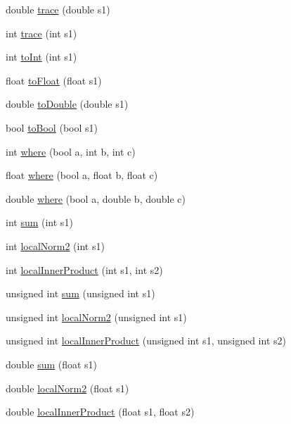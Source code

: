 \begin{DoxyCompactItemize}
double \mbox{\hyperlink{group__simpleword_ga42388e8cf5ff017e87fde24804dc5157}{trace}} (double s1)
\item 
int \mbox{\hyperlink{group__simpleword_ga1cfdc081dea5ca70a94e611e24767931}{trace}} (int s1)
\item 
int \mbox{\hyperlink{group__simpleword_ga8069a9dba7bde8afd620565f8628fb68}{to\+Int}} (int s1)
\item 
float \mbox{\hyperlink{group__simpleword_ga6f3aac1379a793726dc2c71317d99422}{to\+Float}} (float s1)
\item 
double \mbox{\hyperlink{group__simpleword_ga14c2748b5624a157ba57c143b2b67072}{to\+Double}} (double s1)
\item 
bool \mbox{\hyperlink{group__simpleword_gacd3ee735ab005c2fc3af8bdd6c3aa9a6}{to\+Bool}} (bool s1)
\item 
int \mbox{\hyperlink{group__simpleword_gaca8f67f6f4b42cad187907674810e9a6}{where}} (bool a, int b, int c)
\item 
float \mbox{\hyperlink{group__simpleword_ga3fc05e05bd31e7772dd36892a7641c5b}{where}} (bool a, float b, float c)
\item 
double \mbox{\hyperlink{group__simpleword_gad33b774b0681bc74cb80ea6e58ca4992}{where}} (bool a, double b, double c)
\item 
int \mbox{\hyperlink{group__simpleword_ga971787584a79f9a0e9938d4df2021d3f}{sum}} (int s1)
\item 
int \mbox{\hyperlink{group__simpleword_gae87effe93f43b7cdc27ed0c1e7cff904}{local\+Norm2}} (int s1)
\item 
int \mbox{\hyperlink{group__simpleword_ga951b44f16b8a7d800116448b40a3e46d}{local\+Inner\+Product}} (int s1, int s2)
\item 
unsigned int \mbox{\hyperlink{group__simpleword_ga935361714bfaafc123769fd11a4c1e85}{sum}} (unsigned int s1)
\item 
unsigned int \mbox{\hyperlink{group__simpleword_ga7ccc2671554c8711749195fe90772565}{local\+Norm2}} (unsigned int s1)
\item 
unsigned int \mbox{\hyperlink{group__simpleword_gacfa602b05feec2ea8f20fa767834c049}{local\+Inner\+Product}} (unsigned int s1, unsigned int s2)
\item 
double \mbox{\hyperlink{group__simpleword_gabcfac0639bfa76f82af16345860b6de9}{sum}} (float s1)
\item 
double \mbox{\hyperlink{group__simpleword_gaf236f47bd2b5cd9a61a0c11732c85624}{local\+Norm2}} (float s1)
\item 
double \mbox{\hyperlink{group__simpleword_ga29c49899c1c008855b6de7e6eb937893}{local\+Inner\+Product}} (float s1, float s2)

\end{DoxyCompactItemize}
